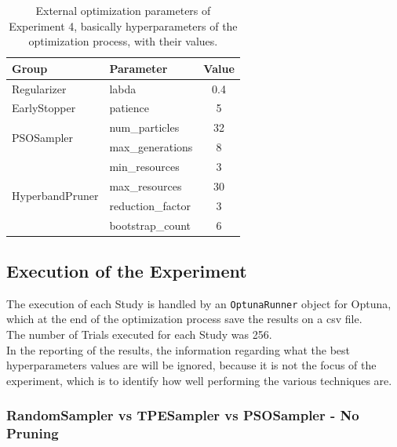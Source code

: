 \begin{table}[ht!]
	\center
	\setlength{\tabcolsep}{0.5cm}
	\caption[Optimization External Parameters of Experiment 4]{External optimization parameters of Experiment 4, basically hyperparameters of the optimization process, with their values.}
	\begin{tabular}{@{}llc@{}}
		\toprule
		\textbf{Group}                   & \textbf{Parameter} & \textbf{Value} \\ \midrule
		Regularizer                      & labda              & 0.4            \\[0.1cm]
		EarlyStopper                     & patience           & 5              \\[0.2cm]
		\multirow{2}{*}{PSOSampler}      & num\_particles     & 32             \\[0.1cm]
										 & max\_generations   & 8              \\[0.2cm]
		\multirow{4}{*}{HyperbandPruner} & min\_resources     & 3              \\[0.1cm]
										 & max\_resources     & 30             \\[0.1cm]
										 & reduction\_factor  & 3              \\[0.1cm]
										 & bootstrap\_count   & 6              \\ \bottomrule
	\end{tabular}
	\label{tab:table-4.4.2}
\end{table}

\subsection{Execution of the Experiment}

The execution of each Study is handled by an \texttt{OptunaRunner} object for Optuna, which at the end of the optimization process save the results on a csv file.
\\[0.3cm]The number of Trials executed for each Study was 256.
\\[0.3cm]In the reporting of the results, the information regarding what the best hyperparameters values are will be ignored, because it is not the focus of the experiment, which is to identify how well performing the various techniques are.

\subsubsection{RandomSampler  vs  TPESampler  vs  PSOSampler  -  No Pruning}

